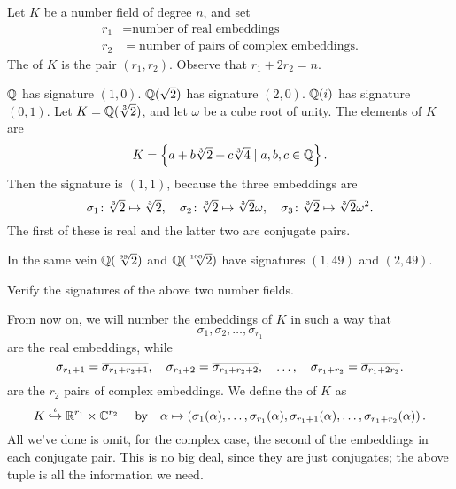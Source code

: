 \begin{definition}
	Let $K$ be a number field of degree $n$, and set
	\begin{align*}
		r_1 &= \text{number of real embeddings} \\
		r_2 &= \text{number of pairs of complex embeddings}.
	\end{align*}
	The  of $K$ is the pair $(r_1, r_2)$.
	Observe that $r_1 + 2r_2 = n$.
\end{definition}
\begin{example}
	\listhack
	\begin{enumerate}[(a)]
		\ii $\mathbb Q$ has signature $(1,0)$.
		\ii $\mathbb Q(\sqrt 2)$ has signature $(2,0)$.
		\ii $\mathbb Q(i)$ has signature $(0,1)$.
		\ii Let $K = \mathbb Q(\sqrt[3]{2})$, and let $\omega$ be a cube root of unity.
		The elements of $K$ are
		\[ K = \left\{ a + b\sqrt[3]{2} + c\sqrt[3]{4} \mid a,b,c \in \mathbb Q  \right\}. \]
		Then the signature is $(1,1)$, because the three embeddings are
		\[ \sigma_1 \colon \sqrt[3]{2} \mapsto \sqrt[3]{2},
			\quad
			\sigma_2 \colon \sqrt[3]{2} \mapsto \sqrt[3]{2} \omega,
			\quad
			\sigma_3 \colon \sqrt[3]{2} \mapsto \sqrt[3]{2} \omega^2. \]
		The first of these is real and the latter two are conjugate pairs.
	\end{enumerate}
\end{example}
\begin{example}
	In the same vein $\mathbb Q(\sqrt[99]{2})$ and $\mathbb Q(\sqrt[100]{2})$
	have signatures $(1,49)$ and $(2,49)$.
\end{example}
\begin{ques}
	Verify the signatures of the above two number fields.
\end{ques}

From now on, we will number the embeddings of $K$ in such a way that
\[ \sigma_1, \sigma_2, \dots, \sigma_{r_1}  \]are the real embeddings,
while
\[
	\sigma_{r_1+1} = \overline{\sigma_{r_1+r_2+1}}, \quad
	\sigma_{r_1+2} = \overline{\sigma_{r_1+r_2+2}}, \quad
	\dots, \quad
	\sigma_{r_1+r_2} = \overline{\sigma_{r_1+2r_2}}.
\]
are the $r_2$ pairs of complex embeddings.
We define the  of $K$ as
\[
	K \overset\iota{\hookrightarrow} \mathbb R^{r_1} \times \mathbb C^{r_2} \
	\quad\text{by}\quad
	\alpha \mapsto  \left( \sigma_1(\alpha), \dots, \sigma_{r_1}(\alpha),
	\sigma_{r_1+1}(\alpha), \dots, \sigma_{r_1+r_2}(\alpha) \right).
\]
All we've done is omit, for the complex case, the second of the embeddings in each conjugate pair.
This is no big deal, since they are just conjugates;
the above tuple is all the information we need.

